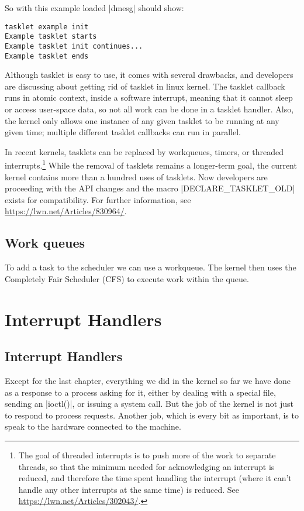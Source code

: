 \documentclass[10pt, oneside]{book}
\begin{document}

So with this example loaded \sh|dmesg| should show:

\begin{verbatim}
tasklet example init
Example tasklet starts
Example tasklet init continues...
Example tasklet ends
\end{verbatim}
Although tasklet is easy to use, it comes with several drawbacks, and developers are discussing about getting rid of tasklet in linux kernel.
The tasklet callback runs in atomic context, inside a software interrupt, meaning that it cannot sleep or access user-space data, so not all work can be done in a tasklet handler.
Also, the kernel only allows one instance of any given tasklet to be running at any given time; multiple different tasklet callbacks can run in parallel.

In recent kernels, tasklets can be replaced by workqueues, timers, or threaded interrupts.\footnote{The goal of threaded interrupts is to push more of the work to separate threads, so that the minimum needed for acknowledging an interrupt is reduced, and therefore the time spent handling the interrupt (where it can't handle any other interrupts at the same time) is reduced.
See \url{https://lwn.net/Articles/302043/}.}
While the removal of tasklets remains a longer-term goal, the current kernel contains more than a hundred uses of tasklets.
Now developers are proceeding with the API changes and the macro \cpp|DECLARE_TASKLET_OLD| exists for compatibility.
For further information, see \url{https://lwn.net/Articles/830964/}.

\subsection{Work queues}
\label{sec:workqueue}
To add a task to the scheduler we can use a workqueue.
The kernel then uses the Completely Fair Scheduler (CFS) to execute work within the queue.


\section{Interrupt Handlers}
\label{sec:interrupt_handler}
\subsection{Interrupt Handlers}
\label{sec:irq}
Except for the last chapter, everything we did in the kernel so far we have done as a response to a process asking for it, either by dealing with a special file, sending an \cpp|ioctl()|, or issuing a system call.
But the job of the kernel is not just to respond to process requests.
Another job, which is every bit as important, is to speak to the hardware connected to the machine.
\end{document}
